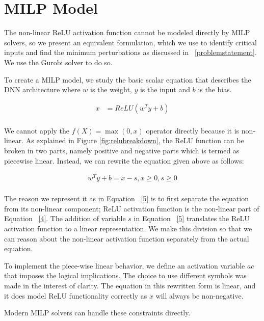 \section{MILP Model}
The non-linear ReLU activation function cannot be modeled directly by MILP solvers, so we present an equivalent formulation, which we use to identify critical inputs and find the minimum perturbations as discussed in ~\ref{problemstatement}. 
We use the Gurobi solver to do so. 

 To create a \ac{MILP} model, we study the basic scalar equation that describes the \ac{DNN} architecture where $w$ is the weight, $y$ is the input and $b$ is the bias. 

\begin{equation}
\label{4}
\begin{aligned}
x &= ReLU(w^Ty + b) \\
\end{aligned}
\end{equation}
 

We cannot apply the $f(X) = \max(0, x)$ operator directly because it is non-linear. 
As explained in Figure \ref{fig:relubreakdown}, the ReLU function can be broken in two parts, namely positive and negative parts which is termed as piecewise linear. 
Instead, we can rewrite the equation given above as follows:

\begin{equation}
\label{5}
\begin{aligned}
w^Ty + b = x - s, x \geq 0, s \geq 0 \\
\end{aligned}
\end{equation}

The reason we represent it as in Equation ~\ref{5} is to first separate the equation from its non-linear component;  ReLU activation function is the non-linear part of Equation ~\ref{4}.
The addition of variable $s$ in Equation ~\ref{5} translates the ReLU activation function to a linear representation.
We make this division so that we can reason about the non-linear activation function separately from the actual equation. 

 To implement the piece-wise linear behavior, we define an activation variable $ac$ that imposes the logical implications. 
The choice to use different symbols was made in the interest of clarity. 
The equation in this rewritten form is linear, and it does model ReLU functionality  correctly as $x$ will always be non-negative. 

Modern MILP solvers can handle these constraints directly.

